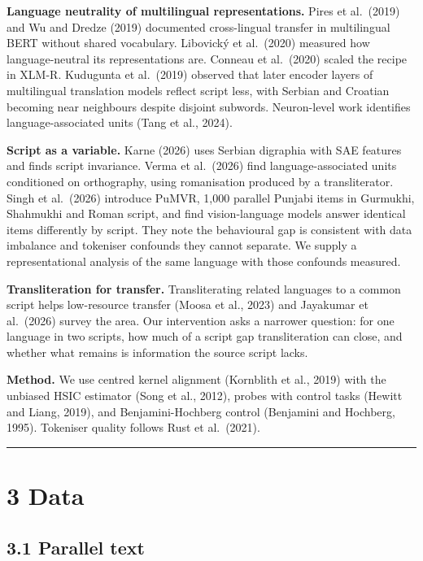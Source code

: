 \textbf{Language neutrality of multilingual representations.} Pires et
al.~(2019) and Wu and Dredze (2019) documented cross-lingual transfer in
multilingual BERT without shared vocabulary. Libovický et al.~(2020)
measured how language-neutral its representations are. Conneau et
al.~(2020) scaled the recipe in XLM-R. Kudugunta et al.~(2019) observed
that later encoder layers of multilingual translation models reflect
script less, with Serbian and Croatian becoming near neighbours despite
disjoint subwords. Neuron-level work identifies language-associated
units (Tang et al., 2024).

\textbf{Script as a variable.} Karne (2026) uses Serbian digraphia with
SAE features and finds script invariance. Verma et al.~(2026) find
language-associated units conditioned on orthography, using romanisation
produced by a transliterator. Singh et al.~(2026) introduce PuMVR, 1,000
parallel Punjabi items in Gurmukhi, Shahmukhi and Roman script, and find
vision-language models answer identical items differently by script.
They note the behavioural gap is consistent with data imbalance and
tokeniser confounds they cannot separate. We supply a representational
analysis of the same language with those confounds measured.

\textbf{Transliteration for transfer.} Transliterating related languages
to a common script helps low-resource transfer (Moosa et al., 2023) and
Jayakumar et al.~(2026) survey the area. Our intervention asks a
narrower question: for one language in two scripts, how much of a script
gap transliteration can close, and whether what remains is information
the source script lacks.

\textbf{Method.} We use centred kernel alignment (Kornblith et al.,
2019) with the unbiased HSIC estimator (Song et al., 2012), probes with
control tasks (Hewitt and Liang, 2019), and Benjamini-Hochberg control
(Benjamini and Hochberg, 1995). Tokeniser quality follows Rust et
al.~(2021).

\begin{center}\rule{0.5\linewidth}{0.5pt}\end{center}

\hypertarget{data}{%
\section{3 Data}\label{data}}

\hypertarget{parallel-text}{%
\subsection{3.1 Parallel text}\label{parallel-text}}

